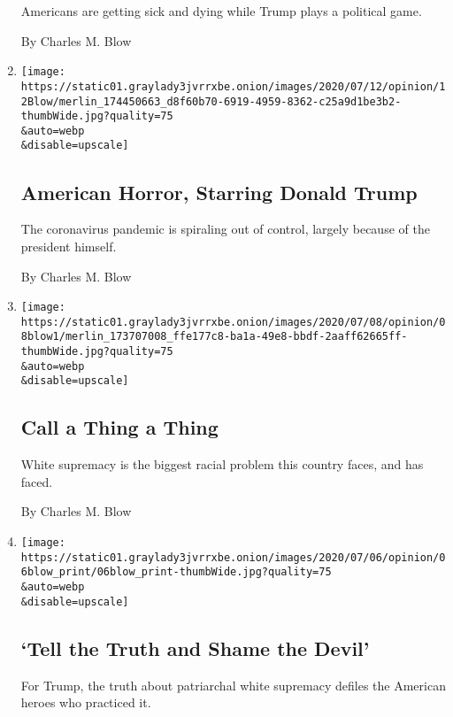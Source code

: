 \begin{enumerate}
  Americans are getting sick and dying while Trump plays a political
  game.

  By Charles M. Blow
\item
  \href{/2020/07/12/opinion/coronavirus-donald-trump.html}{}

  \texttt{[image: https://static01.graylady3jvrrxbe.onion/images/2020/07/12/opinion/12Blow/merlin\_174450663\_d8f60b70-6919-4959-8362-c25a9d1be3b2-thumbWide.jpg?quality=75\\\&auto=webp\\\&disable=upscale]}

  \hypertarget{american-horror-starring-donald-trump}{%
  \subsection{American Horror, Starring Donald
  Trump}\label{american-horror-starring-donald-trump}}

  The coronavirus pandemic is spiraling out of control, largely because
  of the president himself.

  By Charles M. Blow
\item
  \href{/2020/07/08/opinion/racism-united-states.html}{}

  \texttt{[image: https://static01.graylady3jvrrxbe.onion/images/2020/07/08/opinion/08blow1/merlin\_173707008\_ffe177c8-ba1a-49e8-bbdf-2aaff62665ff-thumbWide.jpg?quality=75\\\&auto=webp\\\&disable=upscale]}

  \hypertarget{call-a-thing-a-thing}{%
  \subsection{Call a Thing a Thing}\label{call-a-thing-a-thing}}

  White supremacy is the biggest racial problem this country faces, and
  has faced.

  By Charles M. Blow
\item
  \href{/2020/07/05/opinion/trump-monuments.html}{}

  \texttt{[image: https://static01.graylady3jvrrxbe.onion/images/2020/07/06/opinion/06blow\_print/06blow\_print-thumbWide.jpg?quality=75\\\&auto=webp\\\&disable=upscale]}

  \hypertarget{tell-the-truth-and-shame-the-devil}{%
  \subsection{`Tell the Truth and Shame the
  Devil'}\label{tell-the-truth-and-shame-the-devil}}

  For Trump, the truth about patriarchal white supremacy defiles the
  American heroes who practiced it.


\end{enumerate}
